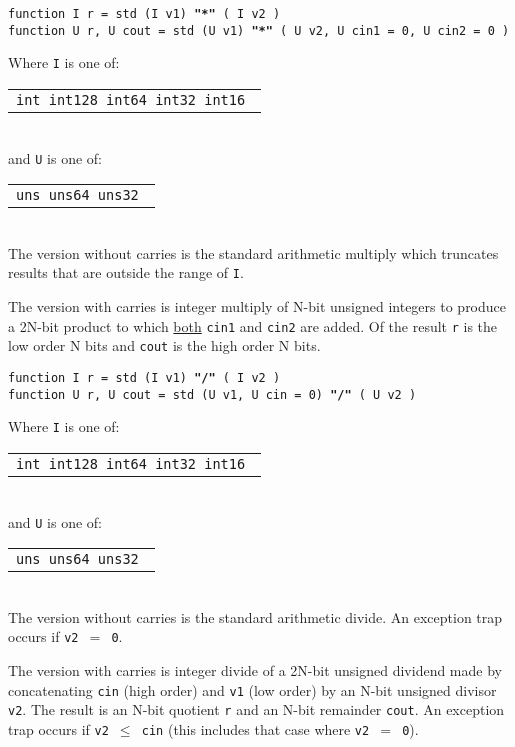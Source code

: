\documentclass[12pt]{article}
\newcommand{\ttkey}[1]{{\tt \bfseries #1}}
\newenvironment{indpar}[1][0.3in]%
	{\begin{list}{}%
		     {\setlength{\itemsep}{0in}%
		      \setlength{\topsep}{0in}%
		      \setlength{\parsep}{1ex}%
		      \setlength{\labelwidth}{#1}%
		      \setlength{\leftmargin}{#1}%
		      \addtolength{\leftmargin}{\labelsep}}%
	 \item}%
	{\end{list}}
\begin{document}
{\tt function I r = std (I v1) \ttkey{"*"} ( I v2 )} \\
{\tt function U r, U cout =
    std (U v1) \ttkey{"*"} ( U v2, U cin1 = 0, U cin2 = 0 )}
\begin{indpar}
Where {\tt I} is one of:
	\begin{tabular}[t]{l}
	\tt int  int128 int64  int32  int16 \\
	\end{tabular}
\\
and {\tt U} is one of:
	\begin{tabular}[t]{l}
	\tt uns  uns64  uns32 \\
	\end{tabular}
\\[1ex]
The version without carries is the standard arithmetic multiply
which truncates results that are outside the range of {\tt I}.

The version with carries is integer multiply of N-bit unsigned
integers to produce a 2N-bit product to which \underline{both}
{\tt cin1} and {\tt cin2} are
added.  Of the result {\tt r} is the low order N bits
and {\tt cout} is the high order N bits.

\end{indpar}

{\tt function I r = std (I v1) \ttkey{"/"} ( I v2 )} \\
{\tt function U r, U cout = std (U v1, U cin = 0) \ttkey{"/"} ( U v2 )}
\begin{indpar}
Where {\tt I} is one of:
	\begin{tabular}[t]{l}
	\tt int  int128 int64  int32  int16 \\
	\end{tabular}
\\
and {\tt U} is one of:
	\begin{tabular}[t]{l}
	\tt uns  uns64  uns32 \\
	\end{tabular}
\\[1ex]
The version without carries is the standard arithmetic divide.
An exception trap occurs if {\tt v2 $=$ 0}.

The version with carries is integer divide of a 2N-bit unsigned
dividend made by concatenating {\tt cin} (high order) and
{\tt v1} (low order) by an N-bit unsigned divisor {\tt v2}.  The result
is an N-bit quotient {\tt r} and an N-bit remainder {\tt cout}.
An exception trap occurs if {\tt v2 $\leq$ cin} (this includes
that case where {\tt v2 $=$ 0}).

\end{indpar}
\end{document}
